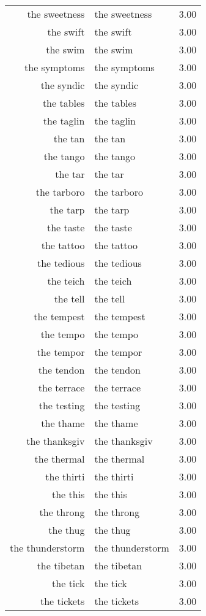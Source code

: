 \begin{table}[ht]
\begin{tabular}{rlr}
  the sweetness & the sweetness & 3.00 \\ 
  the swift & the swift & 3.00 \\ 
  the swim & the swim & 3.00 \\ 
  the symptoms & the symptoms & 3.00 \\ 
  the syndic & the syndic & 3.00 \\ 
  the tables & the tables & 3.00 \\ 
  the taglin & the taglin & 3.00 \\ 
  the tan & the tan & 3.00 \\ 
  the tango & the tango & 3.00 \\ 
  the tar & the tar & 3.00 \\ 
  the tarboro & the tarboro & 3.00 \\ 
  the tarp & the tarp & 3.00 \\ 
  the taste & the taste & 3.00 \\ 
  the tattoo & the tattoo & 3.00 \\ 
  the tedious & the tedious & 3.00 \\ 
  the teich & the teich & 3.00 \\ 
  the tell & the tell & 3.00 \\ 
  the tempest & the tempest & 3.00 \\ 
  the tempo & the tempo & 3.00 \\ 
  the tempor & the tempor & 3.00 \\ 
  the tendon & the tendon & 3.00 \\ 
  the terrace & the terrace & 3.00 \\ 
  the testing & the testing & 3.00 \\ 
  the thame & the thame & 3.00 \\ 
  the thanksgiv & the thanksgiv & 3.00 \\ 
  the thermal & the thermal & 3.00 \\ 
  the thirti & the thirti & 3.00 \\ 
  the this & the this & 3.00 \\ 
  the throng & the throng & 3.00 \\ 
  the thug & the thug & 3.00 \\ 
  the thunderstorm & the thunderstorm & 3.00 \\ 
  the tibetan & the tibetan & 3.00 \\ 
  the tick & the tick & 3.00 \\ 
  the tickets & the tickets & 3.00 \\ 

\end{tabular}
\end{table}

